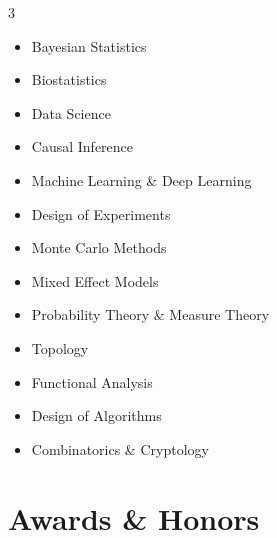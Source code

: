 \documentclass[11pt,a4paper]{article}
\begin{document}
\begin{multicols}{3}
\begin{itemize}[leftmargin=*,noitemsep,topsep=0pt]
  \item Bayesian Statistics
  \item Biostatistics
  \item Data Science
  \item Causal Inference
  \item Machine Learning \& Deep Learning
  \item Design of Experiments
  \item Monte Carlo Methods
  \item Mixed Effect Models
  \item Probability Theory \& Measure Theory
  \item Topology
  \item Functional Analysis
  \item Design of Algorithms
  \item Combinatorics \& Cryptology
\end{itemize}
\end{multicols}

\section{Awards \& Honors}
\end{document}
